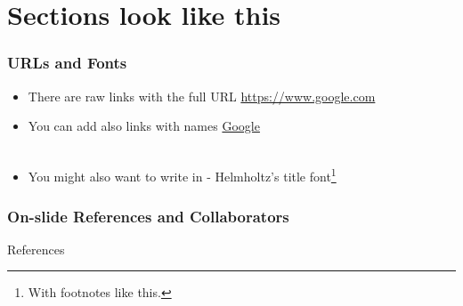 \documentclass[aspectratio=1610]{beamer}
\begin{document}
\section{Sections look like this}


\begin{frame}
    \frametitle{URLs and Fonts}

    \begin{itemize}
        \item There are raw links with the full URL \url{https://www.google.com}
        \item You can add also links with names \href{https://www.google.com}{Google}\\~
        
		\item You might also want to write in  - Helmholtz's title font\footnote{With footnotes like this.}
    \end{itemize}
\end{frame}


\begin{frame}
    \frametitle{On-slide References and Collaborators}

\end{frame}


\begin{frame}[allowframebreaks]{References}
    \printbibliography
\end{frame}
\end{document}
